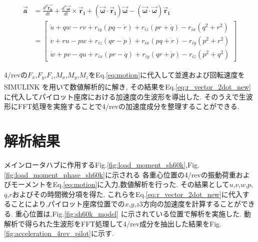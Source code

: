     \begin{equation}
        \begin{aligned}
        \vec{\boldsymbol{a}} & =\frac{d^2 \vec{\boldsymbol{r}_{\mathbf{0}}}}{d t}+\frac{d^* \vec{\boldsymbol{\omega}}}{d t} \times \vec{\boldsymbol{r}}_{\boldsymbol{i}}+\left(\vec{\boldsymbol{\omega}} \cdot \vec{\boldsymbol{r}}_{\boldsymbol{i}}\right) \vec{\boldsymbol{\omega}}-(\vec{\boldsymbol{\omega}} \cdot \vec{\boldsymbol{\omega}}) \vec{\boldsymbol{r}}_{\boldsymbol{i}} \\
        & =\left[\begin{array}{l}
        \dot{u}+q w-r v+r_{iy}(p q-\dot{r})+r_{iz}(p r+\dot{q})-r_{ix}\left(q^2+r^2\right) \\
        \dot{v}+r u-p w+r_{iz}(q r-\dot{p})+r_{ix}(p q+\dot{r})-r_{iy}\left(p^2+r^2\right) \\
        \dot{w}+p v-q u+r_{ix}(p r-\dot{q})+r_{iy}(q r+\dot{p})-r_{iz}\left(p^2+q^2\right)
        \end{array}\right]
        \end{aligned}
        \label{eq:r_vector_2dot_new}
    \end{equation}

    4/revの$F_{x}$,$F_{y}$,$F_{z}$,$M_{x}$,$M_{y}$,$M_{z}$をEq.\eqref{eq:motion}に代入して並進および回転速度を
    SIMULINK\textsuperscript{\textregistered} を用いて数値解析的に解き,
    その結果をEq.\eqref{eq:r_vector_2dot_new}に代入してパイロット座席における加速度の生波形を導出した.
    そのうえで生波形にFFT処理を実施することで4/revの加速度成分を整理することができる.

   \clearpage

    \section{解析結果}
    \label{sec:analysis_result_pilot}
    \par
    メインロータハブに作用するFig.\ref{fig:load_moment_sh60k},Fig.\ref{fig:load_moment_phase_sh60k}に示される
    各重心位置の4/revの振動荷重およびモーメントをEq.\eqref{eq:motion}に入力,数値解析を行った.
    その結果として$u$,$v$,$w$,$p$,$q$,$r$およびその時間微分項を得た.
    これらをEq.\eqref{eq:r_vector_2dot_new}に代入することにより,パイロット座席位置での$x$,$y$,$z$3方向の加速度を計算することができる.
    重心位置は,Fig.\ref{fig:sh60k_model} に示されている位置で解析を実施した.
    動解析で得られた生波形をFFT処理して4/rev成分を抽出した結果をFig.\ref{fig:acceleration_4rev_pilot}に示す.

